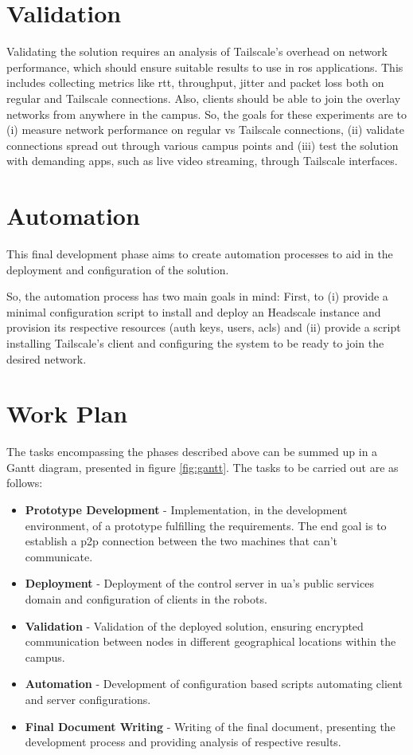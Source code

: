 \documentclass[11pt,twoside,a4paper]{report}
\begin{document}
\section{Validation}
\label{sec:metvalidation}

Validating the solution requires an analysis of Tailscale's overhead on  network performance, which should ensure suitable results to use in \ac{ros} applications. This includes collecting metrics like \ac{rtt}, throughput, jitter and packet loss both on regular and Tailscale connections. Also, clients should be able to join the overlay networks from anywhere in the campus. So, the goals for these experiments are to (i) measure network performance on regular vs Tailscale connections, (ii) validate connections spread out through various campus points and (iii) test the solution with demanding apps, such as live video streaming, through Tailscale interfaces.

\section{Automation}
\label{sec:automethod}

This final development phase aims to create automation processes to aid in the deployment and configuration of the solution.

So, the automation process has two main goals in mind: First, to (i) provide a minimal configuration script to install and deploy an Headscale instance and provision its respective resources (auth keys, users, \acp{acl}) and (ii) provide a script installing Tailscale's client and configuring the system to be ready to join the desired network.

\section{Work Plan}

The tasks encompassing the phases described above can be summed up in a Gantt diagram, presented in figure \ref{fig:gantt}. The tasks to be carried out are as follows:

\begin{itemize}
  \item \textbf{Prototype Development} - Implementation, in the development environment, of a prototype fulfilling the requirements. The end goal is to establish a \ac{p2p} connection between the two machines that can't communicate.
  \item \textbf{Deployment} - Deployment of the control server in \ac{ua}'s public services domain and configuration of clients in the robots.
  \item \textbf{Validation} - Validation of the deployed solution, ensuring encrypted communication between nodes in different geographical locations within the campus.
  \item \textbf{Automation} - Development of configuration based scripts automating client and server configurations.
  \item \textbf{Final Document Writing} - Writing of the final document, presenting the development process and providing analysis of respective results.
\end{itemize}
\end{document}
